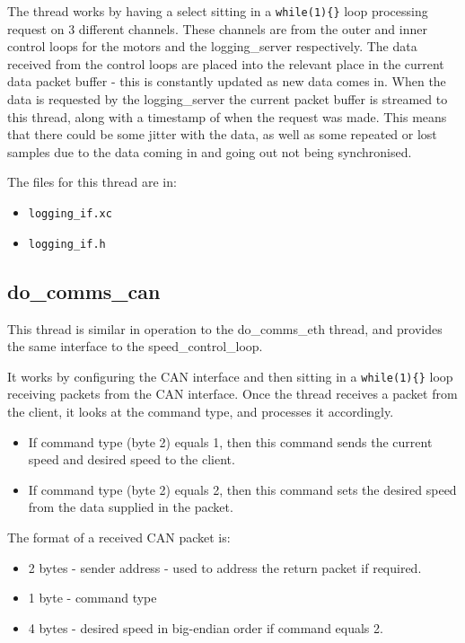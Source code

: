 The thread works by having a select sitting in a \verb!while(1){}! loop processing request on 3 different channels.
These channels are from the outer and inner control loops for the motors and the logging\_server respectively.
The data received from the control loops are placed into the relevant place in the current data packet buffer - this is constantly updated as new data comes in.
When the data is requested by the logging\_server the current packet buffer is streamed to this thread, along with a timestamp of when the request was made.
This means that there could be some jitter with the data, as well as some repeated or lost samples due to the data coming in and going out not being synchronised.

The files for this thread are in:

\begin{itemize}
\item \verb!logging_if.xc!
\item \verb!logging_if.h!
\end{itemize}


\subsection{do\_comms\_can}

This thread is similar in operation to the do\_comms\_eth thread, and provides the same interface to the speed\_control\_loop.

It works by configuring the CAN interface and then sitting in a \verb!while(1){}! loop receiving packets from the CAN interface.
Once the thread receives a packet from the client, it looks at the command type, and processes it accordingly.

\begin{itemize}
\item If command type (byte 2) equals 1, then this command sends the current speed and desired speed to the client.
\item If command type (byte 2) equals 2, then this command sets the desired speed from the data supplied in the packet.
\end{itemize}

The format of a received CAN packet is:

\begin{itemize}
\item 2 bytes - sender address - used to address the return packet if required.
\item 1 byte - command type 
\item 4 bytes - desired speed in big-endian order if command equals 2.
\end{itemize}

